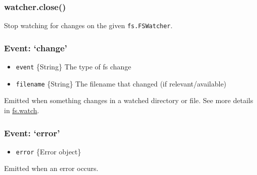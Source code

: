 \subsubsection{watcher.close()}

Stop watching for changes on the given \texttt{fs.FSWatcher}.

\subsubsection{Event: `change'}

\begin{itemize}
\item
  \texttt{event} \{String\} The type of fs change
\item
  \texttt{filename} \{String\} The filename that changed (if
  relevant/available)
\end{itemize}

Emitted when something changes in a watched directory or file. See more
details in
\hyperref[fs_fs_watch_filename_options_listener]{fs.watch}.

\subsubsection{Event: `error'}

\begin{itemize}
\item
  \texttt{error} \{Error object\}
\end{itemize}

Emitted when an error occurs.
